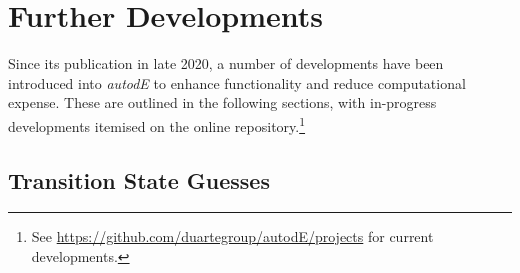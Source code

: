 \documentclass[../../main.tex]{subfiles}
\begin{document}
\setcounter{footnote}{0} 

\newcommand{\ade}{\emph{autodE }}


\section{Further Developments}

Since its publication in late 2020, a number of developments have been introduced into \ade to enhance functionality and reduce computational expense. These are outlined in the following sections, with in-progress developments itemised on the online repository.\footnote{See \url{https://github.com/duartegroup/autodE/projects} for current developments.}

\subsection{Transition State Guesses}
\end{document}
